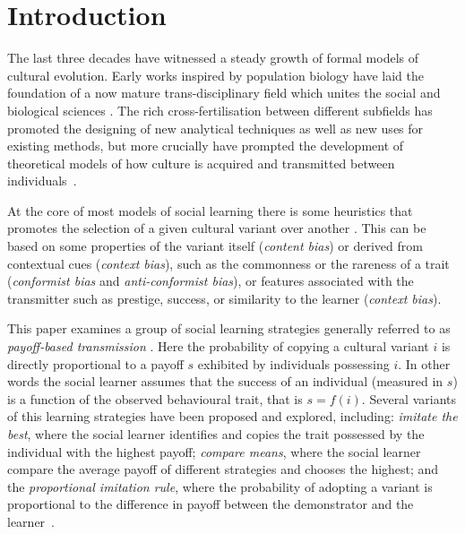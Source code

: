 \documentclass[review,authoryear]{elsarticle}
\begin{document}
\section{Introduction}

The last three decades have witnessed a steady growth of formal models of cultural evolution. Early works inspired by population biology \citep{cavallisforza_feldman_1981,boyd1985} have laid the foundation of a now mature trans-disciplinary field which unites the social and biological sciences \citep{mesoudi_etal_2006, mcelreath_and_boyd_2007}. The rich cross-fertilisation between different subfields has promoted the designing of new analytical techniques as well as new uses for existing methods, but more crucially have prompted the development of theoretical models of how culture is acquired and transmitted between individuals~\citep{mesoudi_cultural_2015}. %

At the core of most models of social learning there is some heuristics that promotes the selection of a given cultural variant over another \citep{laland2004}. This can be based on some properties of the variant itself (\emph{content bias}) or derived from contextual cues (\emph{context bias}), such as the commonness or the rareness of a trait (\emph{conformist bias} and \emph{anti-conformist bias}), or  features associated with the transmitter such as prestige, success, or similarity to the learner (\emph{context bias})\citep{henrich_mcelreath2003}. 

This paper examines a group of social learning strategies generally referred to as \emph{payoff-based transmission} \citep{schlag1998,kendal_etal_2009,lake_and_crema_2012,baldini2013,kandler_and_laland_2013,crema_lake_inpress}. Here the probability of copying a cultural variant $i$ is directly proportional to a payoff $s$ exhibited by individuals possessing $i$. In other words the social learner assumes that the success of an individual (measured in $s$) is a function of the observed behavioural trait, that is $s=f(i)$. Several variants of this learning strategies have been proposed and explored, including: \emph{imitate the best}, where the social learner identifies and copies the trait possessed by the individual with the highest payoff; \emph{compare means}, where the social learner compare the average payoff of different strategies and chooses the highest; and the \emph{proportional imitation rule}, where the probability of adopting a variant is proportional to the difference in payoff between the demonstrator and the learner~\citep{schlag1998,baldini2013,crema_lake_inpress}. 
\end{document}
